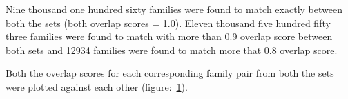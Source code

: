 \documentclass{article}
\begin{document}
		Nine thousand one hundred sixty families were found to match exactly between both the sets (both overlap scores = 1.0). Eleven thousand five hundred fifty three families were found to match with more than 0.9 overlap score between both sets and 12934 families were found to match more that 0.8 overlap score.
		
		Both the overlap scores for each corresponding family pair from both the sets were plotted against each other (figure:~\ref{fig:scatter_lgf5_vs_orthofinder_overlap_lgf5}).
		  
		\begin{figure}[h!]
			\caption{}
			\label{fig:scatter_lgf5_vs_orthofinder_overlap_lgf5}
		\end{figure}
		
\end{document}
